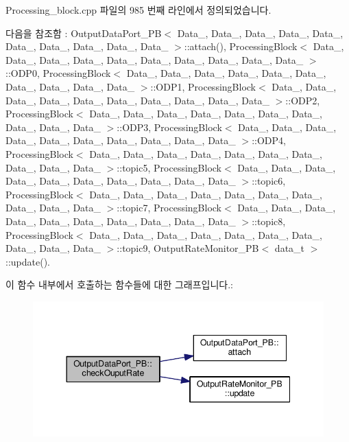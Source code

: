 Processing\+\_\+block.\+cpp 파일의 985 번째 라인에서 정의되었습니다.



다음을 참조함 \+:  Output\+Data\+Port\+\_\+\+P\+B$<$ Data\+\_, Data\+\_, Data\+\_, Data\+\_, Data\+\_, Data\+\_, Data\+\_, Data\+\_, Data\+\_, Data\+\_ $>$\+::attach(), Processing\+Block$<$ Data\+\_, Data\+\_, Data\+\_, Data\+\_, Data\+\_, Data\+\_, Data\+\_, Data\+\_, Data\+\_, Data\+\_ $>$\+::\+O\+D\+P0, Processing\+Block$<$ Data\+\_, Data\+\_, Data\+\_, Data\+\_, Data\+\_, Data\+\_, Data\+\_, Data\+\_, Data\+\_, Data\+\_ $>$\+::\+O\+D\+P1, Processing\+Block$<$ Data\+\_, Data\+\_, Data\+\_, Data\+\_, Data\+\_, Data\+\_, Data\+\_, Data\+\_, Data\+\_, Data\+\_ $>$\+::\+O\+D\+P2, Processing\+Block$<$ Data\+\_, Data\+\_, Data\+\_, Data\+\_, Data\+\_, Data\+\_, Data\+\_, Data\+\_, Data\+\_, Data\+\_ $>$\+::\+O\+D\+P3, Processing\+Block$<$ Data\+\_, Data\+\_, Data\+\_, Data\+\_, Data\+\_, Data\+\_, Data\+\_, Data\+\_, Data\+\_, Data\+\_ $>$\+::\+O\+D\+P4, Processing\+Block$<$ Data\+\_, Data\+\_, Data\+\_, Data\+\_, Data\+\_, Data\+\_, Data\+\_, Data\+\_, Data\+\_, Data\+\_ $>$\+::topic5, Processing\+Block$<$ Data\+\_, Data\+\_, Data\+\_, Data\+\_, Data\+\_, Data\+\_, Data\+\_, Data\+\_, Data\+\_, Data\+\_ $>$\+::topic6, Processing\+Block$<$ Data\+\_, Data\+\_, Data\+\_, Data\+\_, Data\+\_, Data\+\_, Data\+\_, Data\+\_, Data\+\_, Data\+\_ $>$\+::topic7, Processing\+Block$<$ Data\+\_, Data\+\_, Data\+\_, Data\+\_, Data\+\_, Data\+\_, Data\+\_, Data\+\_, Data\+\_, Data\+\_ $>$\+::topic8, Processing\+Block$<$ Data\+\_, Data\+\_, Data\+\_, Data\+\_, Data\+\_, Data\+\_, Data\+\_, Data\+\_, Data\+\_, Data\+\_ $>$\+::topic9, Output\+Rate\+Monitor\+\_\+\+P\+B$<$ data\+\_\+t $>$\+::update().



이 함수 내부에서 호출하는 함수들에 대한 그래프입니다.\+:\nopagebreak
\begin{figure}[H]
\begin{center}
\leavevmode
\includegraphics[width=344pt]{classOutputDataPort__PB_a724d73ba2910560c5e9c7916b95042b8_cgraph}
\end{center}
\end{figure}


